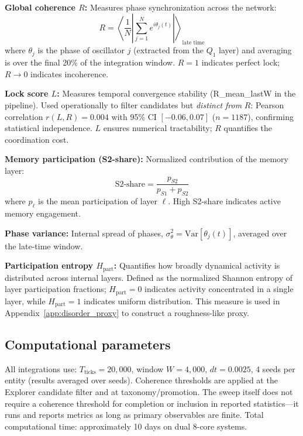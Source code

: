 \documentclass[reprint,aps,prb,superscriptaddress,floatfix]{revtex4-2}
\begin{document}
\textbf{Global coherence $R$:} Measures phase synchronization across the network:
\begin{equation}
R = \left\langle \frac{1}{N}\left|\sum_{j=1}^{N} e^{i\theta_j(t)}\right| \right\rangle_{\text{late time}}
\end{equation}
where $\theta_j$ is the phase of oscillator $j$ (extracted from the $Q_1$ layer) and averaging is over the final 20\% of the integration window. $R = 1$ indicates perfect lock; $R \to 0$ indicates incoherence.

\textbf{Lock score $L$:} Measures temporal convergence stability (R\_mean\_lastW in the pipeline). Used operationally to filter candidates but \emph{distinct from} $R$: Pearson correlation $r(L, R) = 0.004$ with 95\% CI $[-0.06, 0.07]$ ($n = 1187$), confirming statistical independence. $L$ ensures numerical tractability; $R$ quantifies the coordination cost.

\textbf{Memory participation (S2-share):} Normalized contribution of the memory layer:
\begin{equation}
\text{S2-share} = \frac{p_{S2}}{p_{S1} + p_{S2}}
\end{equation}
where $p_\ell$ is the mean participation of layer $\ell$. High S2-share indicates active memory engagement.

\textbf{Phase variance:} Internal spread of phases, $\sigma^2_\theta = \text{Var}[\theta_j(t)]$, averaged over the late-time window.

\textbf{Participation entropy $H_{\mathrm{part}}$:} Quantifies how broadly dynamical activity is distributed across internal layers. Defined as the normalized Shannon entropy of layer participation fractions; $H_{\mathrm{part}} = 0$ indicates activity concentrated in a single layer, while $H_{\mathrm{part}} = 1$ indicates uniform distribution. This measure is used in Appendix~\ref{app:disorder_proxy} to construct a roughness-like proxy.

\subsection{Computational parameters}

All integrations use: $T_{\mathrm{ticks}} = 20{,}000$, window $W = 4{,}000$, $dt = 0.0025$, 4 seeds per entity (results averaged over seeds). Coherence thresholds are applied at the Explorer candidate filter and at taxonomy/promotion. The sweep itself does not require a coherence threshold for completion or inclusion in reported statistics---it runs and reports metrics as long as primary observables are finite. Total computational time: approximately 10 days on dual 8-core systems.
\end{document}
